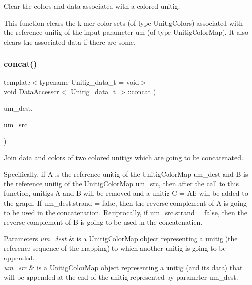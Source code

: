 Clear the colors and data associated with a colored unitig. 

This function clears the k-\/mer color sets (of type \hyperlink{classUnitigColors}{Unitig\+Colors}) associated with the reference unitig of the input parameter um (of type Unitig\+Color\+Map). It also clears the associated data if there are some. \mbox{\label{classDataAccessor_a42b319c9eb802a3a9276227c00f69665}} 
\subsubsection{\texorpdfstring{concat()}{concat()}}
{\footnotesize\ttfamily template$<$typename Unitig\+\_\+data\+\_\+t  = void$>$ \\
void \hyperlink{classDataAccessor}{Data\+Accessor}$<$ Unitig\+\_\+data\+\_\+t $>$\+::concat (\begin{DoxyParamCaption}\item[{const \hyperlink{classUnitigMap}{Unitig\+Color\+Map}$<$ U $>$ \&}]{um\+\_\+dest,  }\item[{const \hyperlink{classUnitigMap}{Unitig\+Color\+Map}$<$ U $>$ \&}]{um\+\_\+src }\end{DoxyParamCaption})}



Join data and colors of two colored unitigs which are going to be concatenated. 

Specifically, if A is the reference unitig of the Unitig\+Color\+Map um\+\_\+dest and B is the reference unitig of the Unitig\+Color\+Map um\+\_\+src, then after the call to this function, unitigs A and B will be removed and a unitig C = AB will be added to the graph. If um\+\_\+dest.\+strand = false, then the reverse-\/complement of A is going to be used in the concatenation. Reciprocally, if um\+\_\+src.\+strand = false, then the reverse-\/complement of B is going to be used in the concatenation. 
\begin{DoxyParams}{Parameters}
{\em um\+\_\+dest} & is a Unitig\+Color\+Map object representing a unitig (the reference sequence of the mapping) to which another unitig is going to be appended. \\
\hline
{\em um\+\_\+src} & is a Unitig\+Color\+Map object representing a unitig (and its data) that will be appended at the end of the unitig represented by parameter um\+\_\+dest. \\
\hline
\end{DoxyParams}
\mbox{\label{classDataAccessor_ad329606e200210ed14a2db858d1cb5ac}} 
